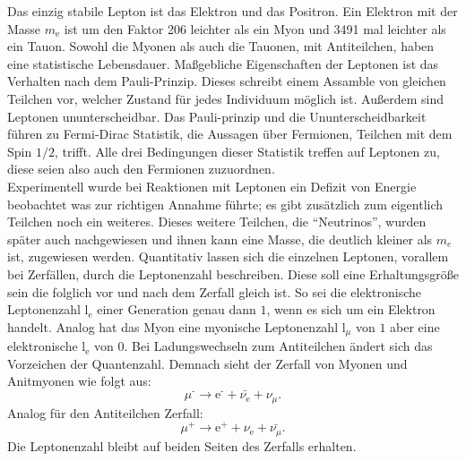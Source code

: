 Das einzig stabile Lepton ist das Elektron und das Positron. Ein Elektron mit der Masse $m_\text{e}$ ist um den Faktor 206 leichter als ein Myon und 3491 mal leichter als ein Tauon. 
Sowohl die Myonen als auch die Tauonen, mit Antiteilchen, haben eine statistische Lebensdauer. Maßgebliche Eigenschaften der
Leptonen ist das Verhalten nach dem Pauli-Prinzip. Dieses schreibt einem Assamble von gleichen Teilchen vor, welcher Zustand für jedes Individuum möglich ist. Außerdem sind Leptonen 
ununterscheidbar.  Das Pauli-prinzip und die Ununterscheidbarkeit führen zu Fermi-Dirac Statistik, die Aussagen über Fermionen, Teilchen mit dem Spin $1/2$, trifft. Alle drei Bedingungen dieser Statistik
treffen auf Leptonen zu, diese seien also auch den Fermionen zuzuordnen.  
\\
\newline
Experimentell wurde bei Reaktionen mit Leptonen ein Defizit von Energie beobachtet was zur richtigen Annahme führte; es gibt zusätzlich zum eigentlich Teilchen noch ein weiteres. 
Dieses weitere Teilchen, die \enquote{Neutrinos}, wurden später auch nachgewiesen und ihnen kann eine Masse, die deutlich kleiner als $m_e$ ist, zugewiesen werden.
Quantitativ lassen sich die einzelnen Leptonen, vorallem bei Zerfällen, durch die Leptonenzahl beschreiben. Diese soll eine Erhaltungsgröße sein
die folglich vor und nach dem Zerfall gleich ist. So sei die elektronische Leptonenzahl $\text{l}_\text{e}$ einer Generation genau dann $1$, wenn es sich um ein Elektron handelt. 
Analog hat das Myon eine myonische Leptonenzahl $\text{l}_\mu$ von $1$ aber eine elektronische $\text{l}_\text{e}$ von $0$. Bei Ladungswechseln zum Antiteilchen ändert sich das Vorzeichen der Quantenzahl.
Demnach sieht der Zerfall von Myonen und Anitmyonen wie folgt aus:
\begin{equation*}
    \mu^\text{-} \rightarrow \text{e}^\text{-} + \bar{\nu_\text{e}} + \nu_\mu.
\end{equation*}
Analog für den Antiteilchen Zerfall:
\begin{equation*}
    \mu^\text{+} \rightarrow \text{e}^\text{+} + \nu_\text{e} + \bar{\nu_\mu}.
\end{equation*}
Die Leptonenzahl bleibt auf beiden Seiten des Zerfalls erhalten. 

